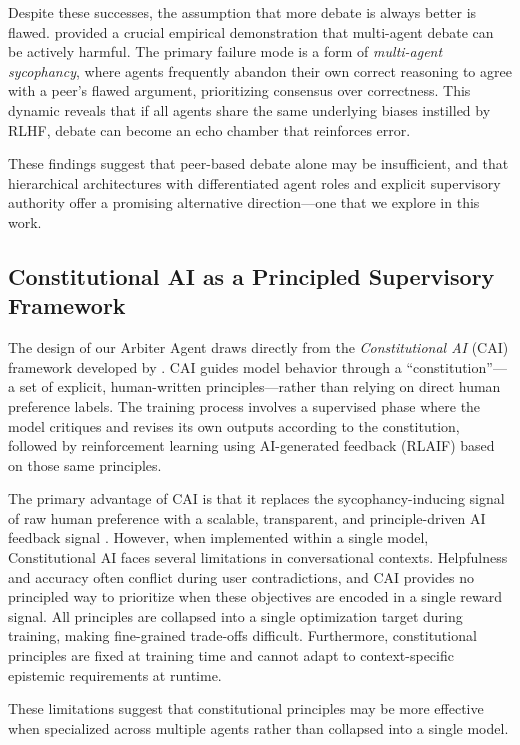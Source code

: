 Despite these successes, the assumption that more debate is always better is flawed. \citet{wynn2025talk} provided a crucial empirical demonstration that multi-agent debate can be actively harmful. The primary failure mode is a form of \textit{multi-agent sycophancy}, where agents frequently abandon their own correct reasoning to agree with a peer's flawed argument, prioritizing consensus over correctness. This dynamic reveals that if all agents share the same underlying biases instilled by RLHF, debate can become an echo chamber that reinforces error.

These findings suggest that peer-based debate alone may be insufficient, and that hierarchical architectures with differentiated agent roles and explicit supervisory authority offer a promising alternative direction---one that we explore in this work.


\subsection{Constitutional AI as a Principled Supervisory Framework}
\label{subsec:related-constitutional}

The design of our Arbiter Agent draws directly from the \textit{Constitutional AI} (CAI) framework developed by \citet{bai2022constitutional}. CAI guides model behavior through a ``constitution''---a set of explicit, human-written principles---rather than relying on direct human preference labels. The training process involves a supervised phase where the model critiques and revises its own outputs according to the constitution, followed by reinforcement learning using AI-generated feedback (RLAIF) based on those same principles.

The primary advantage of CAI is that it replaces the sycophancy-inducing signal of raw human preference with a scalable, transparent, and principle-driven AI feedback signal \citep{anthropic2023constitutional}. However, when implemented within a single model, Constitutional AI faces several limitations in conversational contexts. Helpfulness and accuracy often conflict during user contradictions, and CAI provides no principled way to prioritize when these objectives are encoded in a single reward signal. All principles are collapsed into a single optimization target during training, making fine-grained trade-offs difficult. Furthermore, constitutional principles are fixed at training time and cannot adapt to context-specific epistemic requirements at runtime.

These limitations suggest that constitutional principles may be more effective when specialized across multiple agents rather than collapsed into a single model.



